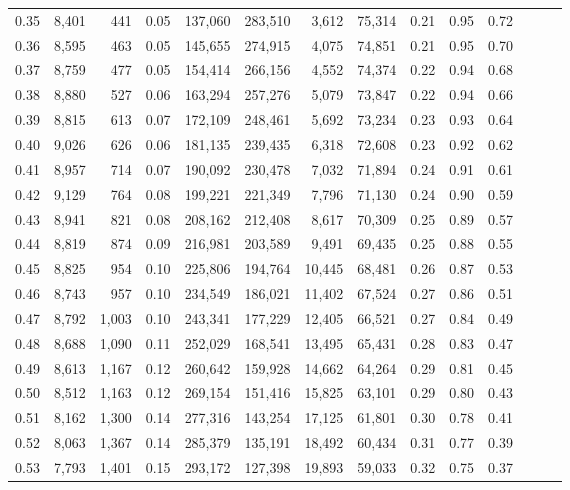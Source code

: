 \begin{tabular}{rrrrrrrrrrrrrr}
0.35 &  8,401 &    441 &  0.05 &  137,060 &  283,510 &   3,612 &  75,314 &  0.21 &  0.95 &      0.72 \\
0.36 &  8,595 &    463 &  0.05 &  145,655 &  274,915 &   4,075 &  74,851 &  0.21 &  0.95 &      0.70 \\
0.37 &  8,759 &    477 &  0.05 &  154,414 &  266,156 &   4,552 &  74,374 &  0.22 &  0.94 &      0.68 \\
0.38 &  8,880 &    527 &  0.06 &  163,294 &  257,276 &   5,079 &  73,847 &  0.22 &  0.94 &      0.66 \\
0.39 &  8,815 &    613 &  0.07 &  172,109 &  248,461 &   5,692 &  73,234 &  0.23 &  0.93 &      0.64 \\
0.40 &  9,026 &    626 &  0.06 &  181,135 &  239,435 &   6,318 &  72,608 &  0.23 &  0.92 &      0.62 \\
0.41 &  8,957 &    714 &  0.07 &  190,092 &  230,478 &   7,032 &  71,894 &  0.24 &  0.91 &      0.61 \\
0.42 &  9,129 &    764 &  0.08 &  199,221 &  221,349 &   7,796 &  71,130 &  0.24 &  0.90 &      0.59 \\
0.43 &  8,941 &    821 &  0.08 &  208,162 &  212,408 &   8,617 &  70,309 &  0.25 &  0.89 &      0.57 \\
0.44 &  8,819 &    874 &  0.09 &  216,981 &  203,589 &   9,491 &  69,435 &  0.25 &  0.88 &      0.55 \\
0.45 &  8,825 &    954 &  0.10 &  225,806 &  194,764 &  10,445 &  68,481 &  0.26 &  0.87 &      0.53 \\
0.46 &  8,743 &    957 &  0.10 &  234,549 &  186,021 &  11,402 &  67,524 &  0.27 &  0.86 &      0.51 \\
0.47 &  8,792 &  1,003 &  0.10 &  243,341 &  177,229 &  12,405 &  66,521 &  0.27 &  0.84 &      0.49 \\
0.48 &  8,688 &  1,090 &  0.11 &  252,029 &  168,541 &  13,495 &  65,431 &  0.28 &  0.83 &      0.47 \\
0.49 &  8,613 &  1,167 &  0.12 &  260,642 &  159,928 &  14,662 &  64,264 &  0.29 &  0.81 &      0.45 \\
0.50 &  8,512 &  1,163 &  0.12 &  269,154 &  151,416 &  15,825 &  63,101 &  0.29 &  0.80 &      0.43 \\
0.51 &  8,162 &  1,300 &  0.14 &  277,316 &  143,254 &  17,125 &  61,801 &  0.30 &  0.78 &      0.41 \\
0.52 &  8,063 &  1,367 &  0.14 &  285,379 &  135,191 &  18,492 &  60,434 &  0.31 &  0.77 &      0.39 \\
0.53 &  7,793 &  1,401 &  0.15 &  293,172 &  127,398 &  19,893 &  59,033 &  0.32 &  0.75 &      0.37 \\

\end{tabular}
